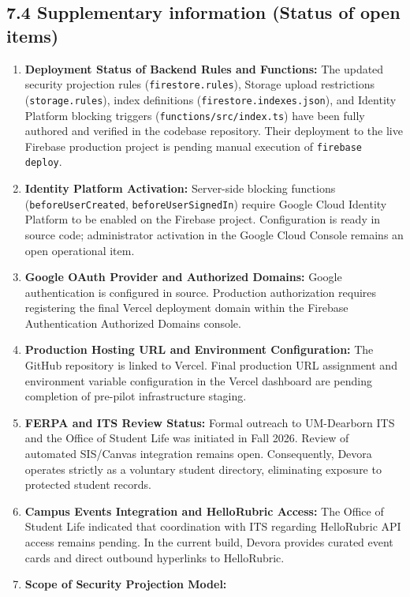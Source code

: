 \documentclass[11pt,letterpaper]{article}
\begin{document}
\subsection*{7.4 Supplementary information (Status of open items)}

\begin{enumerate}[leftmargin=*,itemsep=4pt]
\item \textbf{Deployment Status of Backend Rules and Functions:}
The updated security projection rules (\texttt{firestore.rules}), Storage upload restrictions (\texttt{storage.rules}), index definitions (\texttt{firestore.indexes.json}), and Identity Platform blocking triggers (\texttt{functions/src/index.ts}) have been fully authored and verified in the codebase repository. Their deployment to the live Firebase production project is pending manual execution of \texttt{firebase deploy}.
\item \textbf{Identity Platform Activation:}
Server-side blocking functions (\texttt{beforeUser}\allowbreak\texttt{Created}, \texttt{beforeUser}\allowbreak\texttt{SignedIn}) require Google Cloud Identity Platform to be enabled on the Firebase project. Configuration is ready in source code; administrator activation in the Google Cloud Console remains an open operational item.
\item \textbf{Google OAuth Provider and Authorized Domains:}
Google authentication is configured in source. Production authorization requires registering the final Vercel deployment domain within the Firebase Authentication Authorized Domains console.
\item \textbf{Production Hosting URL and Environment Configuration:}
The GitHub repository is linked to Vercel. Final production URL assignment and environment variable configuration in the Vercel dashboard are pending completion of pre-pilot infrastructure staging.
\item \textbf{FERPA and ITS Review Status:}
Formal outreach to UM-Dearborn ITS and the Office of Student Life was initiated in Fall 2026. Review of automated SIS/Canvas integration remains open. Consequently, Devora operates strictly as a voluntary student directory, eliminating exposure to protected student records.
\item \textbf{Campus Events Integration and HelloRubric Access:}
The Office of Student Life indicated that coordination with ITS regarding HelloRubric API access remains pending. In the current build, Devora provides curated event cards and direct outbound hyperlinks to HelloRubric.
\item \textbf{Scope of Security Projection Model:}

\end{enumerate}
\end{document}
